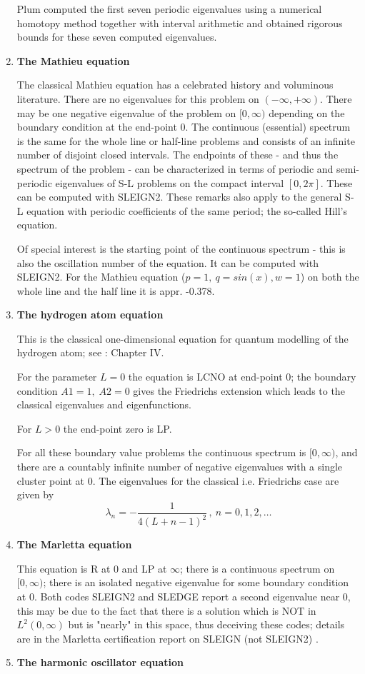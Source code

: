 \begin{enumerate}
Plum \cite{P} computed the first seven periodic eigenvalues using a numerical
homotopy method together with interval arithmetic and obtained rigorous
bounds for these seven computed eigenvalues.
\item %
{\bf The Mathieu equation}

The classical Mathieu equation has a celebrated history and
voluminous literature. There are no eigenvalues for this problem on $(- \infty , +
\infty )$. There may be one negative eigenvalue of the problem on $[0, \infty)$
depending on the boundary condition at the end-point $0$.  The continuous
(essential) spectrum is the same for the whole line or half-line
problems and consists of an infinite number of disjoint closed
intervals. The endpoints of these - and thus the spectrum of the
problem - can be characterized in terms of periodic and semi-periodic
eigenvalues of S-L problems on the compact interval $[0, 2 \pi]$.  These
can be computed with SLEIGN2. These remarks also apply to the general S-L 
equation with periodic coefficients of the same period; the 
so-called Hill's equation.

Of special interest is the starting point of the continuous spectrum -
this is also the oscillation number of the equation.  It can be computed
with SLEIGN2. For the Mathieu equation ($p=1, \ q=sin(x), w=1$) on both the 
whole line and the half line it is appr. -0.378.
\item %
{\bf The hydrogen atom equation}

This is the classical one-dimensional equation for quantum modelling of
the hydrogen atom; see \cite{T}: Chapter IV.

For the parameter $L=0$ the equation is LCNO at end-point $0$; the boundary
condition $A1=1, \; A2=0$ gives the Friedrichs extension which leads to
the classical eigenvalues and eigenfunctions.

For $L>0$ the end-point zero is LP.

For all these boundary value problems the continuous spectrum is 
$[0, \infty )$, and there are a countably infinite number 
of negative eigenvalues with a single cluster point at 0. The eigenvalues 
for the classical i.e. Friedrichs case are given by 
$$
\lambda_n = - \dfrac{1}{4(L+n-1)^2} \, , \ n=0,1,2, \ldots 
$$

\item %
{\bf The Marletta equation}

This equation is R at 0 and LP at $\infty $; there is a continuous
spectrum on $[0, \infty )$; there is an isolated negative eigenvalue for
some boundary condition at 0. Both codes SLEIGN2 and SLEDGE report a second 
eigenvalue near 0, this may be due to the fact that there is a solution which is 
 NOT in
$L^2 (0, \infty)$ but is "nearly" in this space, thus deceiving these codes; 
details are in the Marletta certification 
report on SLEIGN (not SLEIGN2) \cite{M}.
\item %
{ \bf The harmonic oscillator equation}


\end{enumerate}

